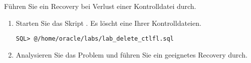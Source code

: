     \item F\"uhren Sie ein Recovery bei Verlust einer Kontrolldatei durch.
      \begin{enumerate}
        \item Starten Sie das Skript . Es l\"oscht eine Ihrer Kontrolldateien.
          \begin{lstlisting}[language=terminal]
SQL> @/home/oracle/labs/lab_delete_ctlfl.sql
          \end{lstlisting}
        \item Analysieren Sie das Problem und f\"uhren Sie ein geeignetes Recovery durch.
      \end{enumerate}
